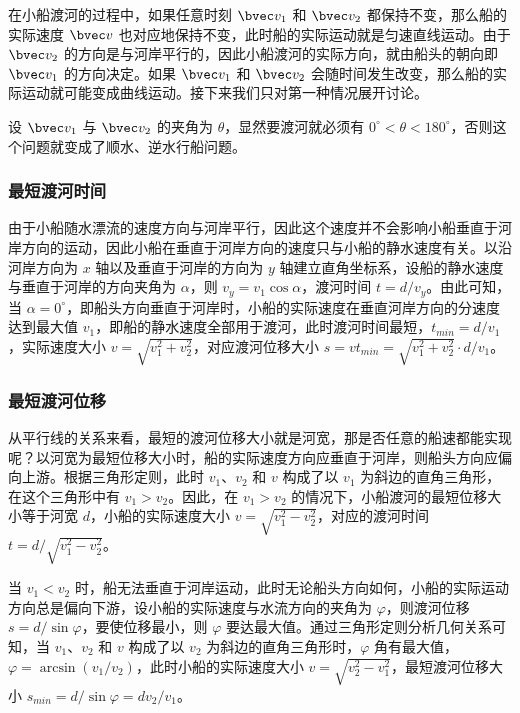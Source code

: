在小船渡河的过程中，如果任意时刻 $\bvec v_1$ 和 $\bvec v_2$ 都保持不变，那么船的实际速度 $\bvec v$ 也对应地保持不变，此时船的实际运动就是匀速直线运动。由于 $\bvec v_2$ 的方向是与河岸平行的，因此小船渡河的实际方向，就由船头的朝向即 $\bvec v_1$ 的方向决定。如果 $\bvec v_1$ 和 $\bvec v_2$ 会随时间发生改变，那么船的实际运动就可能变成曲线运动。接下来我们只对第一种情况展开讨论。

设 $\bvec v_1$ 与 $\bvec v_2$ 的夹角为 $\theta$，显然要渡河就必须有 $0^\circ < \theta < 180^\circ $，否则这个问题就变成了顺水、逆水行船问题。

\subsubsection{最短渡河时间}

由于小船随水漂流的速度方向与河岸平行，因此这个速度并不会影响小船垂直于河岸方向的运动，因此小船在垂直于河岸方向的速度只与小船的静水速度有关。以沿河岸方向为 $x$ 轴以及垂直于河岸的方向为 $y$ 轴建立直角坐标系，设船的静水速度与垂直于河岸的方向夹角为 $\alpha$，则 $v_y = v_1 \cos \alpha$，渡河时间 $t=d/v_y$。由此可知，当 $\alpha = 0^\circ$，即船头方向垂直于河岸时，小船的实际速度在垂直河岸方向的分速度达到最大值 $v_1$，即船的静水速度全部用于渡河，此时渡河时间最短，$t_{min}=d/v_1$，实际速度大小 $v=\sqrt{v_1^2+v_2^2}$，对应渡河位移大小 $s=vt_{min}=\sqrt{v_1^2+v_2^2}\cdot d/v_1$。

\subsubsection{最短渡河位移}

从平行线的关系来看，最短的渡河位移大小就是河宽，那是否任意的船速都能实现呢？以河宽为最短位移大小时，船的实际速度方向应垂直于河岸，则船头方向应偏向上游。根据三角形定则，此时 $v_1$、$v_2$ 和 $v$ 构成了以 $v_1$ 为斜边的直角三角形，在这个三角形中有 $v_1>v_2$。因此，在 $v_1>v_2$ 的情况下，小船渡河的最短位移大小等于河宽 $d$，小船的实际速度大小 $v=\sqrt{v_1^2-v_2^2}$，对应的渡河时间 $t=d/\sqrt{v_1^2-v_2^2}$。

当 $v_1<v_2$ 时，船无法垂直于河岸运动，此时无论船头方向如何，小船的实际运动方向总是偏向下游，设小船的实际速度与水流方向的夹角为 $\varphi$，则渡河位移 $s = d/\sin \varphi$，要使位移最小，则 $\varphi$ 要达最大值。通过三角形定则分析几何关系可知，当 $v_1$、$v_2$ 和 $v$ 构成了以 $v_2$ 为斜边的直角三角形时，$\varphi$ 角有最大值，$\varphi=\arcsin(v_1/v_2)$，此时小船的实际速度大小 $v=\sqrt{v_2^2-v_1^2}$，最短渡河位移大小 $s_{min} = d/\sin \varphi=dv_2/v_1$。

